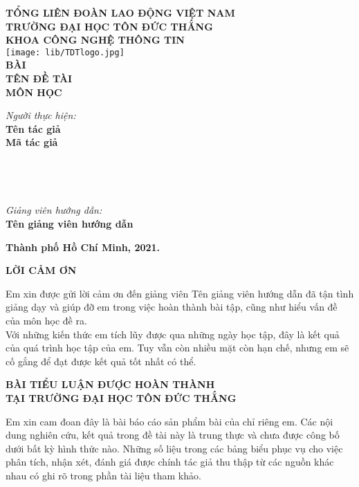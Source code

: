 \documentclass[12pt,a4paper,2sides]{report}
\newcommand{\khoa}{công nghệ thông tin} %
\newcommand{\bai}{bài}
\newcommand{\de}{tên đề tài}
\newcommand{\monhoc}{môn học} %
\newcommand{\gvhd}{Tên giảng viên hướng dẫn} %
\newcommand{\tacgia}{Tên tác giả} %
\newcommand{\mstacgia}{Mã tác giả} %
\newcommand{\svhai}{}
\newcommand{\msvhai}{}
\newcommand{\svba}{}
\newcommand{\msvba}{}
\newcommand{\nam}{2021}
\begin{document}
	
% 
\begin{center}
	\large{\textbf{TỔNG LIÊN ĐOÀN LAO ĐỘNG VIỆT NAM}} \\
	\large{\textbf{TRƯỜNG ĐẠI HỌC TÔN ĐỨC THẮNG}} \\
	\large{\textbf{\MakeUppercase{KHOA \khoa}}} \\\vspace*{1cm}	
	\texttt{[image: lib/TDTlogo.jpg]}\\\vspace*{1cm}	
	\Large{\textbf{\MakeUppercase{\bai}}}\\		
	\LARGE{\textbf{\MakeUppercase{\de}}}\\
	\Large{\textbf{\MakeUppercase{\monhoc}}}\vspace*{1.5cm}
\begin{flushright}			

	\large{\textit{Người thực hiện:}} \\
	\large{\textbf{\tacgia}}\\
	\large{\textbf{\mstacgia}}\\
	\large{\textbf{\svhai}}\\
	\large{\textbf{\msvhai}}\\
	\large{\textbf{\svba}}\\
	\large{\textbf{\msvba}}\\
	\large{\textit{Giảng viên hướng dẫn:}} \\
	\large{\textbf{\gvhd}} 
	\vspace*{1.5cm}
\end{flushright}
	\large{\textbf{Thành phố Hồ Chí Minh, \nam.}}
\end{center}	
	\newpage
\begin{center}
	\Large{\textbf{LỜI CẢM ƠN}}
\end{center}

	Em xin được gửi lời cảm ơn đến giảng viên \gvhd \mbox{} đã tận tình giảng dạy và giúp đỡ em trong việc hoàn thành bài tập, cũng như hiểu vấn đề của môn học đề ra.\\
	
	Với những kiến thức em tích lũy được qua những ngày học tập, đây là kết quả của quá trình học tập của em. Tuy vẫn còn nhiều mặt còn hạn chế, nhưng em sẽ cố gắng để đạt được kết quả tốt nhất có thể.\\
	\newpage
\begin{center}
	\Large{\textbf{BÀI TIỂU LUẬN ĐƯỢC HOÀN THÀNH}} \\
	\Large{\textbf{TẠI TRƯỜNG ĐẠI HỌC TÔN ĐỨC THẮNG}} \\
\end{center}	
Em xin cam đoan đây là bài báo cáo sản phẩm \bai \mbox{} của chỉ riêng em. Các nội dung nghiên cứu, kết quả trong đề tài này là trung thực và chưa được công bố dưới bất kỳ hình thức nào. Những số liệu trong các bảng biểu phục vụ cho việc phân tích, nhận xét, đánh giá được chính tác giả thu thập từ các nguồn khác nhau có ghi rõ trong phần tài liệu tham khảo.\\
\end{document}
